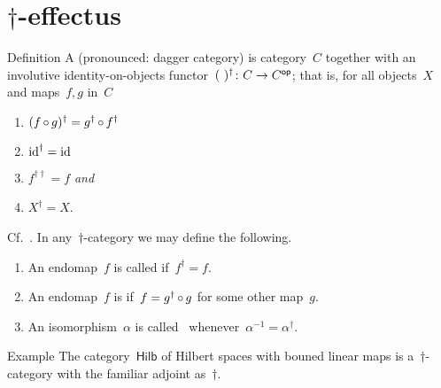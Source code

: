 \documentclass[b]{subfiles}
\begin{document}
\section{$\dagger$-effectus}
\begin{parsec}%
\begin{point}{Definition}%
A  (pronounced: dagger category)
is category~$C$ together with an involutive identity-on-objects
    functor~$(\ )^\dagger \colon C \to {C}{^{\mathsf{op}}}$;
    that is, for all objects~$X$ and maps~$f,g$ in~$C$
\begin{multicols}{2}
\begin{enumerate}
    \item $(f \mathop{\circ} g)^\dagger = g^\dagger \mathop{\circ} f^\dagger$
    \item $\operatorname{id}^\dagger = \operatorname{id}$
    \item $f^{\dagger\dagger} = f$ \emph{and}
    \item $X^\dagger = X$.
\end{enumerate}
\end{multicols}
\noindent
Cf.~\cite{burgin1970categories,selinger2007dagger,heunenphd}.
In any~$\dagger$-category we may define the following.
\begin{enumerate}
\item
    An endomap~$f$ is called 
    if~$f^\dagger = f$.
\item
    An endomap~$f$ is 
    if~$f = g^\dagger \mathop{\circ} g$ for some other map~$g$.
\item
    An isomorphism~$\alpha$ is called~
        whenever~$\alpha^{-1} = \alpha^\dagger$.
\end{enumerate}
\end{point}
\begin{point}{Example}%
The category~$\mathsf{Hilb}$
    of Hilbert spaces with bouned linear maps
    is a~$\dagger$-category
    with the familiar adjoint as~$\dagger$.
\end{point}
\end{parsec}
\end{document}
